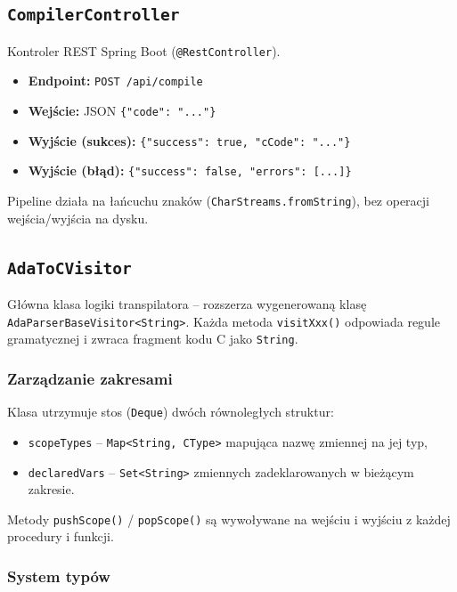 \documentclass[12pt,a4paper]{article}
\begin{document}
\subsection{\texttt{CompilerController}}

Kontroler REST Spring Boot (\texttt{@RestController}).

\begin{itemize}
  \item \textbf{Endpoint:} \texttt{POST /api/compile}
  \item \textbf{Wejście:} JSON \texttt{\{"code": "..."\}}
  \item \textbf{Wyjście (sukces):} \texttt{\{"success": true, "cCode": "..."\}}
  \item \textbf{Wyjście (błąd):} \texttt{\{"success": false, "errors": [...]\}}
\end{itemize}

Pipeline działa na łańcuchu znaków (\texttt{CharStreams.fromString}),
bez operacji wejścia/wyjścia na dysku.

\subsection{\texttt{AdaToCVisitor}}

Główna klasa logiki transpilatora -- rozszerza wygenerowaną klasę
\texttt{AdaParserBaseVisitor<String>}. Każda metoda \texttt{visitXxx()}
odpowiada regule gramatycznej i zwraca fragment kodu C jako \texttt{String}.

\subsubsection{Zarządzanie zakresami}

Klasa utrzymuje stos (\texttt{Deque}) dwóch równoległych struktur:
\begin{itemize}
  \item \texttt{scopeTypes} -- \texttt{Map<String, CType>} mapująca
        nazwę zmiennej na jej typ,
  \item \texttt{declaredVars} -- \texttt{Set<String>} zmiennych
        zadeklarowanych w bieżącym zakresie.
\end{itemize}
Metody \texttt{pushScope()} / \texttt{popScope()} są wywoływane na wejściu
i wyjściu z każdej procedury i funkcji.

\subsubsection{System typów}
\end{document}
